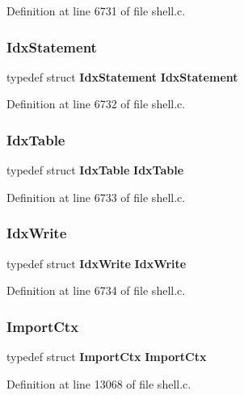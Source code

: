 Definition at line 6731 of file shell.\+c.

\mbox{\label{shell_8c_a7f02917c087f36cab586f225800b747c}} 
\subsubsection{Idx\+Statement}
{\footnotesize\ttfamily typedef struct \textbf{ Idx\+Statement} \textbf{ Idx\+Statement}}



Definition at line 6732 of file shell.\+c.

\mbox{\label{shell_8c_ad8e03a1cc90ae45c1d29b9c42109d092}} 
\subsubsection{Idx\+Table}
{\footnotesize\ttfamily typedef struct \textbf{ Idx\+Table} \textbf{ Idx\+Table}}



Definition at line 6733 of file shell.\+c.

\mbox{\label{shell_8c_afb29aeb1541aba06af801495c63287c4}} 
\subsubsection{Idx\+Write}
{\footnotesize\ttfamily typedef struct \textbf{ Idx\+Write} \textbf{ Idx\+Write}}



Definition at line 6734 of file shell.\+c.

\mbox{\label{shell_8c_a4f85b49f3d8654de355005d5def004ef}} 
\subsubsection{Import\+Ctx}
{\footnotesize\ttfamily typedef struct \textbf{ Import\+Ctx} \textbf{ Import\+Ctx}}



Definition at line 13068 of file shell.\+c.

\mbox{\label{shell_8c_a2feca17dfbd8e8fcc0466a62c7d870cd}} 
